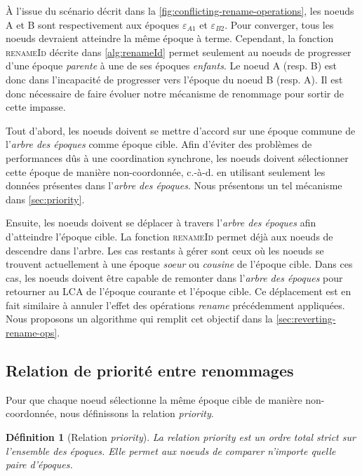 \documentclass[12pt]{thesul}
\newtheorem{definition}{Définition}
\newcommand{\ie}{c.-à-d. }
\newcommand{\epoch}[1]{$\varepsilon_{#1}$}
\begin{document}
À l'issue du scénario décrit dans la \autoref{fig:conflicting-rename-operations}, les noeuds A et B sont respectivement aux époques \epoch{A1} et \epoch{B2}.
Pour converger, tous les noeuds devraient atteindre la même époque à terme.
Cependant, la fonction \textsc{renameId} décrite dans \autoref{alg:renameId} permet seulement au noeuds de progresser d'une époque \emph{parente} à une de ses époques \emph{enfants}.
Le noeud A (resp. B) est donc dans l'incapacité de progresser vers l'époque du noeud B (resp. A).
Il est donc nécessaire de faire évoluer notre mécanisme de renommage pour sortir de cette impasse.

Tout d'abord, les noeuds doivent se mettre d'accord sur une époque commune de l'\emph{arbre des époques} comme époque cible.
Afin d'éviter des problèmes de performances dûs à une coordination synchrone, les noeuds doivent sélectionner cette époque de manière non-coordonnée, \ie en utilisant seulement les données présentes dans l'\emph{arbre des époques}.
Nous présentons un tel mécanisme dans \autoref{sec:priority}.

Ensuite, les noeuds doivent se déplacer à travers l'\emph{arbre des époques} afin d'atteindre l'époque cible.
La fonction \textsc{renameId} permet déjà aux noeuds de descendre dans l'arbre.
Les cas restants à gérer sont ceux où les noeuds se trouvent actuellement à une époque \emph{soeur} ou \emph{cousine} de l'époque cible.
Dans ces cas, les noeuds doivent être capable de remonter dans l'\emph{arbre des époques} pour retourner au \ac{LCA} de l'époque courante et l'époque cible.
Ce déplacement est en fait similaire à annuler l'effet des opérations \emph{rename} précédemment appliquées.
Nous proposons un algorithme qui remplit cet objectif dans la \autoref{sec:reverting-rename-ops}.

\subsection{Relation de priorité entre renommages}

\label{sec:priority}

Pour que chaque noeud sélectionne la même époque cible de manière non-coordonnée, nous définissons la relation \emph{priority}.

\begin{definition}[Relation \emph{priority}]
  La relation \emph{priority} est un ordre total strict sur l'ensemble des époques.
  Elle permet aux noeuds de comparer n'importe quelle paire d'époques.
\end{definition}
\end{document}
